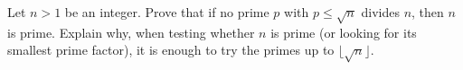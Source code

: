 Let $n>1$ be an integer. Prove that if no prime $p$ with $p\le\sqrt{n}$ divides $n$, then $n$ is prime. Explain why, when testing whether $n$ is prime (or looking for its smallest prime factor), it is enough to try the primes up to $\lfloor\sqrt{n}\rfloor$.

